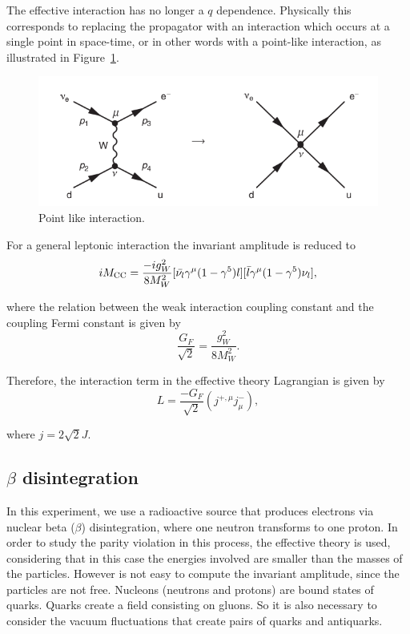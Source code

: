 \documentclass[10pt,swedish, openany]{book}
\begin{document}
The effective interaction has no longer a $q$ dependence. Physically this corresponds to replacing the propagator with an interaction which occurs at a single point in space-time, or in other words with a point-like interaction, as illustrated in Figure~\ref{fig:PointLikeInteraction}.

\begin{figure}[h]
\includegraphics[scale=0.5]{Fermi.png}
\centering
\caption{Point like interaction.}
\label{fig:PointLikeInteraction}
\end{figure}  

For a general leptonic interaction the invariant amplitude is reduced to
\begin{equation}
    i M_{\rm CC} = \frac{- i g_W^2}{8M_W^2}[\bar{\nu_l}\gamma^{\mu}(1-\gamma^5)l][\bar{l}\gamma^{\mu}(1-\gamma^5)\nu_l], 
\end{equation}

where the relation between the weak interaction coupling constant and the coupling Fermi constant is given by
\begin{equation}
    \frac{G_F}{\sqrt{2}} = \frac{g_W^2}{8 M_W^2}.
\end{equation} 

Therefore, the interaction term in the effective theory Lagrangian is given by
\begin{equation}
L = \frac{-G_F}{\sqrt{2}}(j^{+,\mu} j^-_{\mu}),
\end{equation}

where $j = 2\sqrt{2} J$.

\subsection{$\beta$ disintegration}

In this experiment, we use a radioactive source that produces electrons via nuclear beta  ($\beta$) disintegration, where one neutron transforms to one proton. In order to study the parity violation in this process, the effective theory is used, considering that in this case the energies involved are smaller than the masses of the particles. However is not easy to compute the invariant amplitude, since the particles are not free. Nucleons (neutrons and protons) are bound states of quarks. Quarks create a field consisting on gluons. So it is also necessary to consider the vacuum fluctuations that create pairs of quarks and antiquarks.
\end{document}
